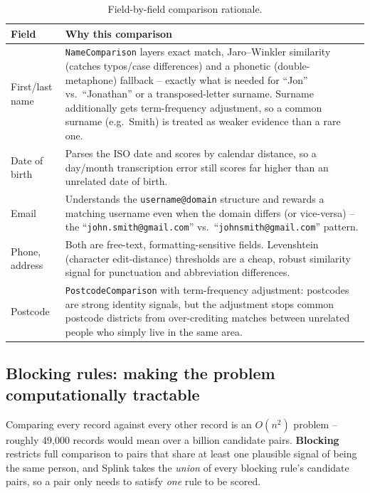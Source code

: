 \documentclass[11pt]{report}
\newcommand{\code}[1]{\lstinline[style=plain]!#1!}
\begin{document}
\begin{table}[h]
\centering
\small
\begin{tabular}{@{}p{2.6cm}p{10cm}@{}}
\toprule
\textbf{Field} & \textbf{Why this comparison} \\
\midrule
First/last name & \code{NameComparison} layers exact match, Jaro--Winkler similarity (catches typos/case differences) and a phonetic (double-metaphone) fallback -- exactly what is needed for ``Jon'' vs.\ ``Jonathan'' or a transposed-letter surname. Surname additionally gets term-frequency adjustment, so a common surname (e.g.\ Smith) is treated as weaker evidence than a rare one. \\
Date of birth & Parses the ISO date and scores by calendar distance, so a day/month transcription error still scores far higher than an unrelated date of birth. \\
Email & Understands the \texttt{username@domain} structure and rewards a matching username even when the domain differs (or vice-versa) -- the ``\code{john.smith@gmail.com}'' vs.\ ``\code{johnsmith@gmail.com}'' pattern. \\
Phone, address & Both are free-text, formatting-sensitive fields. Levenshtein (character edit-distance) thresholds are a cheap, robust similarity signal for punctuation and abbreviation differences. \\
Postcode & \code{PostcodeComparison} with term-frequency adjustment: postcodes are strong identity signals, but the adjustment stops common postcode districts from over-crediting matches between unrelated people who simply live in the same area. \\
\bottomrule
\end{tabular}
\caption{Field-by-field comparison rationale.}
\end{table}

\subsection{Blocking rules: making the problem computationally tractable}

\begin{engbox}
Comparing every record against every other record is an $O(n^2)$ problem -- roughly 49,000 records would mean over a billion candidate pairs. \textbf{Blocking} restricts full comparison to pairs that share at least one plausible signal of being the same person, and Splink takes the \emph{union} of every blocking rule's candidate pairs, so a pair only needs to satisfy \emph{one} rule to be scored.
\end{engbox}
\end{document}

